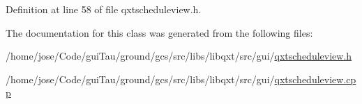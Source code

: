 Definition at line 58 of file qxtscheduleview.\-h.



The documentation for this class was generated from the following files\-:\begin{DoxyCompactItemize}
\item 
/home/jose/\-Code/gui\-Tau/ground/gcs/src/libs/libqxt/src/gui/\hyperlink{qxtscheduleview_8h}{qxtscheduleview.\-h}\item 
/home/jose/\-Code/gui\-Tau/ground/gcs/src/libs/libqxt/src/gui/\hyperlink{qxtscheduleview_8cpp}{qxtscheduleview.\-cpp}\end{DoxyCompactItemize}
